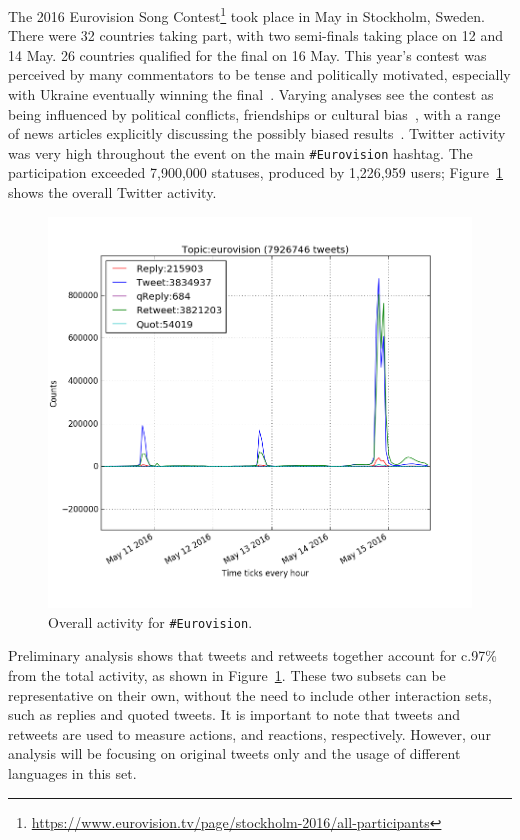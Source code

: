 The 2016 Eurovision Song
Contest\footnote{\url{https://www.eurovision.tv/page/stockholm-2016/all-participants}}
took place in May in Stockholm, Sweden. There were 32 countries taking
part, with two semi-finals taking place on 12 and 14 May. 26 countries
qualified for the final on 16 May. This year’s contest was perceived
by many commentators to be tense and politically motivated, especially
with Ukraine eventually winning the
final~\cite{telegrapheuroboycott:2016}. Varying analyses see the
contest as being influenced by political conflicts, friendships or
cultural
bias~\cite{ginsburgh+noury:2008,charron:2013,blangiardo+baio:2014,budzinski+pannicke:2016},
with a range of news articles explicitly discussing the possibly
biased results~\cite{telegrapheurobias:2016}.  Twitter activity was
very high throughout the event on the main {\texttt{\#Eurovision}}
hashtag. The participation exceeded 7,900,000 statuses, produced by
1,226,959 users; Figure~\ref{fig:overalleurovisionactivity} shows the overall
Twitter activity.

\begin{figure}[htb]
\centering
\includegraphics[width=\columnwidth]{images/overalleurovisionactivity.png}
\caption{Overall activity for {\texttt{\#Eurovision}}.}
\label{fig:overalleurovisionactivity}
\end{figure}

Preliminary analysis shows that tweets and retweets together account
for c.97\% from the total activity, as shown in
Figure~\ref{fig:overalleurovisionactivity}. These two subsets can be
representative on their own, without the need to include other
interaction sets, such as replies and quoted tweets. It is important
to note that tweets and retweets are used to measure actions, and
reactions, respectively. However, our analysis will be focusing on
original tweets only and the usage of different languages in this set.

